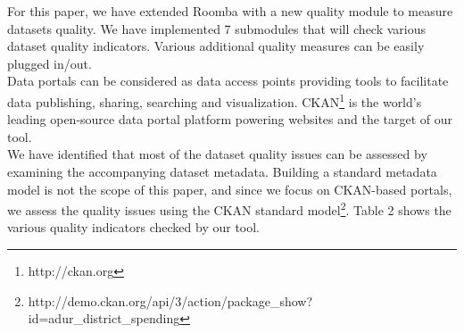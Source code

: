\documentclass[onecolumn, crcready]{iosart2c}
\begin{document}
For this paper, we have extended Roomba with a new quality module to measure datasets quality. We have implemented 7 submodules that will check various dataset quality indicators. Various additional quality measures can be easily plugged in/out.\\

Data portals can be considered as data access points providing tools to facilitate data publishing, sharing, searching and visualization. CKAN\footnote{http://ckan.org} is the world's leading open-source data portal platform powering websites and the target of our tool.\\
We have identified that most of the dataset quality issues can be assessed by examining the accompanying dataset metadata. Building a standard metadata model is not the scope of this paper, and since we focus on CKAN-based portals, we assess the quality issues using the CKAN standard model\footnote{http://demo.ckan.org/api/3/action/package\_show?id=adur\_district\_spending}. Table 2 shows the various quality indicators checked by our tool.
\end{document}
